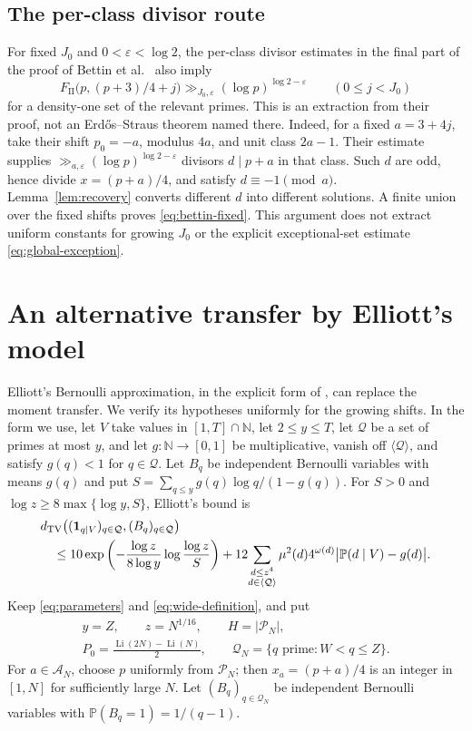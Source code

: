\documentclass[11pt]{article}
\theoremstyle{remark}\newtheorem{remark}[theorem]{Remark}
\newcommand{\Li}{\operatorname{Li}}
\newcommand{\Prob}{\mathbb P}
\newcommand{\one}{\mathbf 1}
\newcommand{\cP}{\mathcal P}
\newcommand{\cA}{\mathcal A}
\newcommand{\eps}{\varepsilon}
\newcommand{\FII}{F_{\mathrm {II}}}
\begin{document}
\subsection{The per-class divisor route}
For fixed $J_0$ and $0<\eps<\log2$, the per-class divisor estimates in
the final part of the proof of Bettin et al.\
\cite[Lemma~4.9 and equation~(4.3)]{Bettin} also imply
\begin{equation}\label{eq:bettin-fixed}
 \FII\bigl(p,(p+3)/4+j\bigr)
 \gg_{J_0,\eps}(\log p)^{\log2-\eps}
 \qquad(0\le j<J_0)
\end{equation}
for a density-one set of the relevant primes. This is an extraction
from their proof, not an Erd\H{o}s--Straus theorem named there.
Indeed, for a fixed $a=3+4j$, take their shift $p_0=-a$, modulus
$4a$, and unit class $2a-1$. Their estimate supplies
$\gg_{a,\eps}(\log p)^{\log2-\eps}$ divisors $d\mid p+a$ in that class.
Such $d$ are odd, hence divide $x=(p+a)/4$, and satisfy $d\equiv-1\pmod a$.
Lemma~\ref{lem:recovery} converts different $d$ into different solutions.
A finite union over the fixed shifts proves \eqref{eq:bettin-fixed}.
This argument does not extract uniform constants for growing $J_0$ or
the explicit exceptional-set estimate \eqref{eq:global-exception}.

\section{An alternative transfer by Elliott's model}\label{app:elliott}
Elliott's Bernoulli approximation, in the explicit form of
\cite[Theorem~1.1]{Gorodetsky}, can replace the moment transfer.
We verify its hypotheses uniformly for the growing shifts.
In the form we use, let $V$ take values in $[1,T]\cap\mathbb N$,
let $2\le y\le T$, let $\mathcal Q$ be a set of primes at most $y$, and let
$g:\mathbb N\to[0,1]$ be multiplicative, vanish off
$\langle\mathcal Q\rangle$, and satisfy $g(q)<1$ for $q\in\mathcal Q$.
Let $B_q$ be independent Bernoulli variables with means $g(q)$ and put
$S=\sum_{q\le y}g(q)\log q/(1-g(q))$.
For $S>0$ and $\log z\ge8\max\{\log y,S\}$, Elliott's bound is
\begin{align}
 &d_{\mathrm{TV}}\bigl((\one_{q\mid V})_{q\in\mathcal Q},
                         (B_q)_{q\in\mathcal Q}\bigr)\notag\\
 &\quad\le10\exp\left(-\frac{\log z}{8\log y}
                              \log\frac{\log z}{S}\right)
 +12\!\sum_{\substack{d\le z^4\\d\in\langle\mathcal Q\rangle}}
       \mu^2(d)4^{\omega(d)}\bigl|\Prob(d\mid V)-g(d)\bigr|.
       \label{eq:elliott-input}
\end{align}
Keep \eqref{eq:parameters} and \eqref{eq:wide-definition}, and put
\[
\begin{gathered}
 y=Z,\qquad z=N^{1/16},\qquad H=|\cP_N|,\\
 P_0=\frac{\Li(2N)-\Li(N)}2,\qquad
 \mathcal Q_N=\{q\text{ prime}:W<q\le Z\}.
\end{gathered}
\]
For $a\in\cA_N$, choose $p$ uniformly from $\cP_N$; then
$x_a=(p+a)/4$ is an integer in $[1,N]$ for sufficiently large $N$.
Let $(B_q)_{q\in\mathcal Q_N}$ be independent Bernoulli variables
with $\Prob(B_q=1)=1/(q-1)$.
\end{document}
